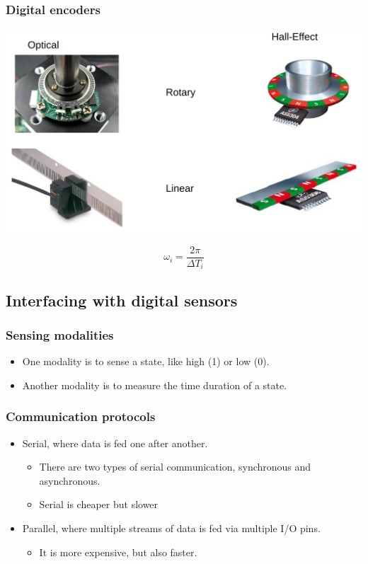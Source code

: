 \documentclass[11pt]{article}
\begin{document}
\subsubsection{Digital encoders}
\label{sec:org3d2304a}
\begin{center}
\includegraphics[width=.9\linewidth]{./images/digital-encoders.png}
\end{center}
  \[\omega_i = \frac{2 \pi}{\Delta T_i}\]

\subsection{Interfacing with digital sensors}
\label{sec:org18bf177}

\subsubsection{Sensing modalities}
\label{sec:orge651257}
\begin{itemize}
\item One modality is to sense a state, like high (1) or low (0).
\item Another modality is to measure the time duration of a state.
\end{itemize}

\subsubsection{Communication protocols}
\label{sec:org5abedbd}
\begin{itemize}
\item Serial, where data is fed one after another.
\begin{itemize}
\item There are two types of serial communication, synchronous and asynchronous.
\item Serial is cheaper but slower
\end{itemize}
\item Parallel, where multiple streams of data is fed via multiple I/O pins.
\begin{itemize}
\item It is more expensive, but also faster.
\end{itemize}
\end{itemize}
\end{document}
